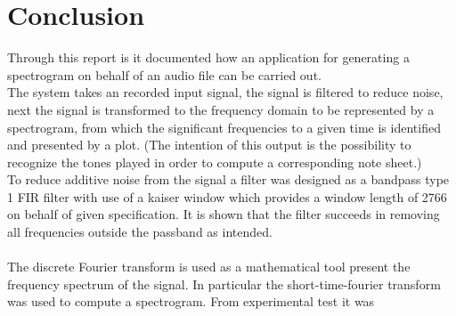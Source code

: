 \chapter{Conclusion}
Through this report is it documented how an application for generating a spectrogram on behalf of an audio file can be carried out.\\
The system takes an recorded input signal, the signal is filtered to reduce noise, next the signal is transformed to the frequency domain to be represented by a spectrogram, from which the significant frequencies to a given time is identified and presented by a plot. (The intention of this output is the possibility to recognize the tones played in order to compute a corresponding note sheet.)\\
To reduce additive noise from the signal a  filter was designed as a bandpass type 1 FIR filter with use of a kaiser window which provides a window length of 2766 on behalf of given specification. It is shown that the filter succeeds in removing all frequencies outside the passband as intended.\\
\\
The discrete Fourier transform is used as a mathematical tool present the frequency spectrum of the signal. In particular the short-time-fourier transform was used to compute a spectrogram. From experimental test it was     
 